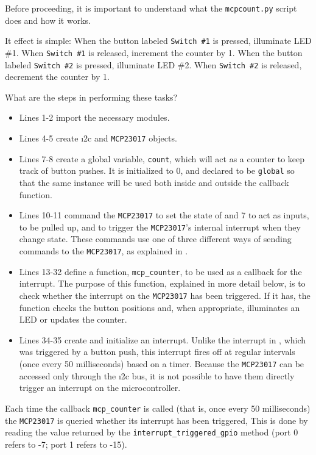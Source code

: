 Before proceeding, it is important to understand what the \texttt{mcp\textunderscore count.py} script does and how it works.

It effect is simple:
When the button labeled \texttt{Switch \#1} is pressed, illuminate LED \#1.
When  \texttt{Switch \#1} is released, increment the counter by 1.
When the button labeled \texttt{Switch \#2} is pressed, illuminate LED \#2.
When  \texttt{Switch \#2} is released, decrement the counter by 1.

What are the steps in performing these tasks?
\begin{itemize}
\item Lines 1-2 import the necessary modules.
\item Lines 4-5 create \i2c and \texttt{MCP23017} objects.
\item Lines 7-8 create a global variable, \texttt{count}, which will act as a counter to keep track of button pushes.
It is initialized to 0, and declared to be \texttt{global} so that the same instance will be used both inside and outside the callback function.
\item Lines 10-11 command the \texttt{MCP23017} to set the state of  and 7 to act as inputs, to be pulled up, and to trigger the \texttt{MCP23017}'s internal interrupt when they change state.
These commands use one of three different ways of sending commands to the \texttt{MCP23017}, as explained in .
\item Lines 13-32 define a function, \lstinline{mcp_counter}, to be used as a callback for the interrupt.
The purpose of this function, explained in more detail below, is to check whether the interrupt on the \texttt{MCP23017} has been triggered.
If it has, the function checks the button positions and, when appropriate, illuminates an LED or updates the counter.
\item Lines 34-35 create and initialize an interrupt.
Unlike the interrupt in , which was triggered by a button push, this interrupt fires off at regular intervals (once every 50 milliseconds) based on a timer.
Because the \texttt{MCP23017} \gpios can be accessed only through the \i2c bus, it is not possible to have them directly trigger an interrupt on the microcontroller.
\end{itemize}

Each time the callback \lstinline{mcp_counter} is called (that is, once every 50 milliseconds) the \texttt{MCP23017} is queried whether its interrupt has been triggered,
This is done by reading the value returned by the \lstinline{interrupt_triggered_gpio} method (port 0 refers to -7; port 1 refers to -15).

